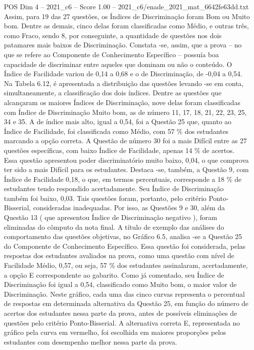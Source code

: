 \begin{textsample}{POS Dim 4 – 2021\_c6 – Score 1.00 – 2021\_c6/enade\_2021\_mat\_6642fe63dd.txt}
Assim, para 19 das 27 questões, os Índices de Discriminação foram Bom ou Muito bom.
Dentre as demais, cinco delas foram classificadas como Médio, e outras três, como Fraco, sendo 8, por conseguinte, a quantidade de questões nos dois patamares mais baixos de Discriminação.
Constata -se, assim, que a prova – no que se refere ao Componente de Conhecimento Específico – possuía boa capacidade de discriminar entre aqueles que dominam ou não o conteúdo.
O Índice de Facilidade variou de 0,14 a 0,68 e o de Discriminação, de -0,04 a 0,54.
Na Tabela 6.12, é apresentada a distribuição das questões levando -se em conta, simultaneamente, a classificação dos dois índices.
Dentre as questões que alcançaram os maiores Índices de Discriminação, nove delas foram classificadas com Índice de Discriminação Muito bom, as de número 11, 17, 18, 21, 22, 23, 25, 34 e 35.
A de índice mais alto, igual a 0,54, foi a Questão 25 que, quanto ao Índice de Facilidade, foi classificada como Médio, com 57 \% dos estudantes marcando a opção correta.
A Questão de número 30 foi a mais Difícil entre as 27 questões específicas, com baixo Índice de Facilidade, apenas 14 \% de acertos.
Essa questão apresentou poder discriminatório muito baixo, 0,04, o que comprova ter sido a mais Difícil para os estudantes.
Destaca -se, também, a Questão 9, com Índice de Facilidade 0,18, o que, em termos percentuais, corresponde a 18 \% de estudantes tendo respondido acertadamente.
Seu Índice de Discriminação também foi baixo, 0,03.
Tais questões foram, portanto, pelo critério Ponto-Bisserial, consideradas inadequadas.
Por isso, as Questões 9 e 30, além da Questão 13 ( que apresentou Índice de Discriminação negativo ), foram eliminadas do cômputo da nota final.
A título de exemplo das análises do comportamento das questões objetivas, no Gráfico 6.5, analisa -se a Questão 25 do Componente de Conhecimento Específico.
Essa questão foi considerada, pelas respostas dos estudantes avaliados na prova, como uma questão com nível de Facilidade Médio, 0,57, ou seja, 57 \% dos estudantes assinalaram, acertadamente, a opção E correspondente ao gabarito.
Como já comentado, seu Índice de Discriminação foi igual a 0,54, classificado como Muito bom, o maior valor de Discriminação.
Neste gráfico, cada uma das cinco curvas representa o percentual de respostas em determinada alternativa da Questão 25, em função do número de acertos dos estudantes nessa parte da prova, antes de possíveis eliminações de questões pelo critério Ponto-Bisserial.
A alternativa correta E, representada no gráfico pela curva em vermelho, foi escolhida em maiores proporções pelos estudantes com desempenho melhor nessa parte da prova.

\end{textsample}

